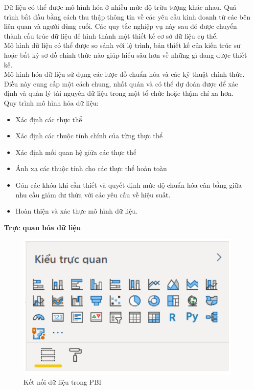 Dữ liệu có thể được mô hình hóa ở nhiều mức độ trừu tượng khác nhau.
Quá trình bắt đầu bằng cách thu thập thông tin về các yêu cầu kinh doanh từ các bên liên quan và người dùng cuối. Các quy tắc nghiệp vụ này sau đó được chuyển thành cấu trúc dữ liệu để hình thành một thiết kế cơ sở dữ liệu cụ thể.\\
Mô hình dữ liệu có thể được so sánh với lộ trình, bản thiết kế của kiến trúc sư hoặc bất kỳ sơ đồ chính thức nào giúp hiểu sâu hơn về những gì đang được thiết kế.\\
Mô hình hóa dữ liệu sử dụng các lược đồ chuẩn hóa và các kỹ thuật chính
thức. Điều này cung cấp một cách chung, nhất quán và có thể dự đoán được để xác định và quản lý tài nguyên dữ liệu trong một tổ chức hoặc thậm chí xa hơn.\\
Quy trình mô hình hóa dữ liệu:
\begin{itemize}[label=$-$]
    \item Xác định các thực thể
    \item Xác định các thuộc tính chính của từng thực thể
    \item Xác định mối quan hệ giữa các thực thể
    \item Ánh xạ các thuộc tính cho các thực thể hoàn toàn
    \item Gán các khóa khi cần thiết và quyết định mức độ chuẩn hóa cân bằng giữa nhu cầu giảm dư thừa với các yêu cầu về hiệu suất.
    \item Hoàn thiện và xác thực mô hình dữ liệu.
\end{itemize}
\newpage
\textbf{Trực quan hóa dữ liệu}
\begin{center}
            \begin{figure}[!h]
                \centering
                \includegraphics[scale = 1]{figures/Duyen/Các kiểu trực quan hóa dữ liệu trong PBI.PNG}
              \caption{Kết nối dữ liệu trong PBI}
            \end{figure}
\end{center}
